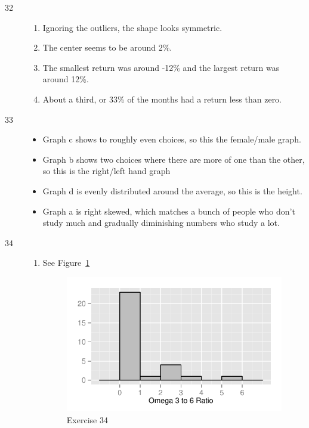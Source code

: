 \documentclass[letterpaper, landscape]{exam}
\begin{document}
\begin{description}
      \item[32]
        \begin{enumerate}[{a}]
          \item Ignoring the outliers, the shape looks symmetric.

          \item The center seems to be around 2\%.

          \item The smallest return was around -12\% and the largest return was
          around 12\%.

          \item About a third, or 33\% of the months had a return less than
          zero.
        \end{enumerate}

      \item[33]
        \begin{itemize}
          \item Graph c shows to roughly even choices, so this the female/male graph.

          \item Graph b shows two choices where there are more of one than the
            other, so this is the right/left hand graph 

          \item Graph d is evenly distributed around the average, so
            this is the height.

          \item Graph a is right skewed, which matches a bunch of people who
            don't study much and gradually diminishing numbers who study a lot.
        \end{itemize}

      \item[34]
        \begin{enumerate}[{a}]
          \item See Figure~\ref{fig:ex34}
            \begin{figure}[H]
              \centering
              \includegraphics{figures/ex34.pdf}
              \caption{Exercise 34}\label{fig:ex34}
            \end{figure}


\end{enumerate}
\end{description}
\end{document}
